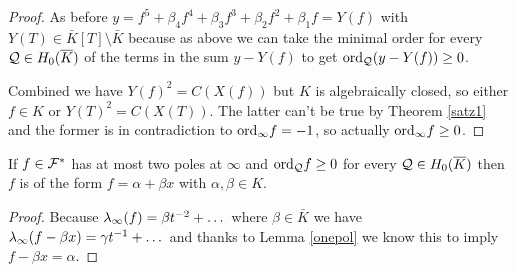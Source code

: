\documentclass[english,11pt,a4paper]{article}
\begin{document}
\begin{lemma}
\begin{proof}
		As before $y = f^5 + \beta_4 f^4 + \beta_3 f^3 + \beta_2 f^2 + \beta_1 f = Y(f)$ with $Y(T)\in \bar K[T] \setminus \bar K$
		because as above we can take the minimal order for every $\mathcal{Q} \in H_0(\overline K)$ of the terms in the sum $y - Y(f)$ to get $\text{ord}_{\mathcal{Q}} (y - Y(f)) \geq 0$.
		

		Combined we have $Y(f)^2 = C(X(f))$ but $K$ is algebraically closed, so either $f \in K$ or $Y(T)^2 = C(X(T))$. The latter can't be true by Theorem \ref{satz1} and the former is in contradiction to $\text{ord}_{\infty} f = -1$, so actually $\text{ord}_{\infty} f \geq 0$.%
	\end{proof}
\end{lemma}


\begin{lemma}\label{twopol}
	If $f \in \mathcal{F}^*$ has at most two poles at $\infty$ and $\text{ord}_{\mathcal{Q}} f \geq 0$ for every $\mathcal{Q} \in H_0(\overline K)$ then $f$ is of the form $f = \alpha + \beta x$ with $\alpha, \beta \in K$.
	\begin{proof}
		Because $\lambda_{\infty} (f) = \beta t^{-2} + \dots$ where $\beta \in \bar K$ we have $\lambda_{\infty} (f - \beta x)= \gamma t^{-1} + \dots$ and thanks to Lemma \ref{onepol} we know this to imply $f - \beta x = \alpha$.
	\end{proof}
\end{lemma}

\end{document}
